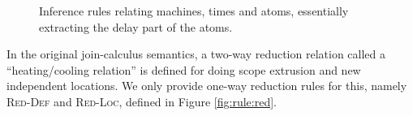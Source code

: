 \begin{figure}[!h]
\caption{Inference rules relating machines, times and atoms, essentially
extracting the delay part of the atoms.}
\label{fig:rule:sched}
\end{figure}

In the original join-calculus semantics, a two-way reduction relation called a
``heating/cooling relation'' is defined for doing scope extrusion and new
independent locations. We only provide one-way reduction rules for this, namely
\textsc{Red-Def} and \textsc{Red-Loc}, defined in Figure \ref{fig:rule:red}.

